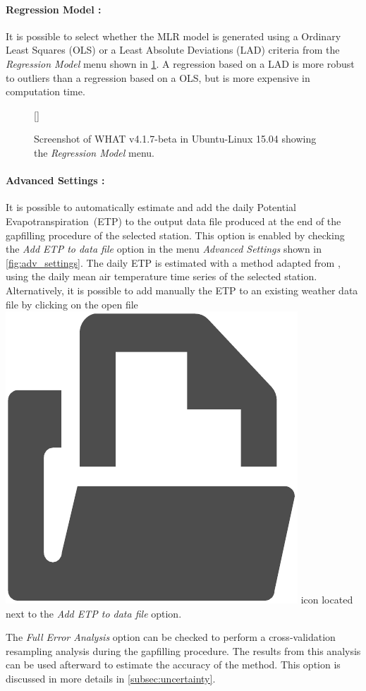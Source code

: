 \documentclass[WHATMANUAL.tex]{subfiles}
\begin{document}
\paragraph{Regression Model :} It is possible to select whether the MLR model is generated using a Ordinary Least Squares (OLS) or a Least Absolute Deviations (LAD) criteria from the \emph{Regression Model} menu shown in \cref{fig:regression_model}. A regression based on a LAD is more robust to outliers than a regression based on a OLS, but is more expensive in computation time.

\begin{figure}[!ht]
    \setlength{\fboxsep}{0pt}
    [\FBwidth]
	{
	 \caption{Screenshot of WHAT v4.1.7-beta in Ubuntu-Linux 15.04 showing the \emph{Regression Model} menu.}
	 \label{fig:regression_model}
	}
	{
	}
\end{figure}

\paragraph{Advanced Settings :} It is possible to automatically estimate and add the daily Potential Evapotranspiration~(ETP) to the output data file produced at the end of the gapfilling procedure of the selected station. This option is enabled by checking the \emph{Add ETP to data file} option in the menu \emph{Advanced Settings} shown in \cref{fig:adv_settings}. The daily ETP is estimated with a method adapted from \cite{thornthwaite_approach_1948}, using the daily mean air temperature time series of the selected station. Alternatively, it is possible to add manually the ETP to an existing weather data file by clicking on the open file~{\includegraphics[height=2ex]{img/open_file}} icon located next to the \emph{Add ETP to data file} option.

The \emph{Full Error Analysis} option can be checked to perform a cross-validation resampling analysis during the gapfilling procedure. The results from this analysis can be used afterward to estimate the accuracy of the method. This option is discussed in more details in \cref{subsec:uncertainty}.
\end{document}
